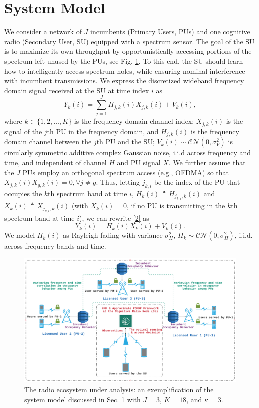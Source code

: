 \documentclass[10pt,twocolumn]{IEEEtran}
\begin{document}
\section{System Model}\label{II}
We consider a network of $J$ incumbents (Primary Users, PUs) and one cognitive radio (Secondary User, SU) equipped with a spectrum sensor. The goal of the SU is to maximize its own throughput by opportunistically accessing portions of the spectrum left unused by the PUs, see Fig. \ref{fig:0}. To this end, the SU should learn how to intelligently access spectrum holes, while ensuring nominal interference with incumbent transmissions. We express the discretized wideband frequency domain signal received at the SU at time index $i$ as
\begin{equation}\label{2}
    Y_k(i) = \sum_{j=1}^{J} H_{j,k}(i)X_{j,k}(i) + V_k(i),
\end{equation}
where  $k {\in} \{1,2,\dots,K\}$
is the frequency domain channel index; $X_{j,k}(i)$ is the signal of the $j$th PU in the frequency domain, and $H_{j,k}(i)$ is the frequency domain channel between the $j$th PU and the SU; $V_k(i) {\sim} \mathcal{CN}(0,\sigma_V^2)$ is circularly symmetric additive complex Gaussian noise, i.i.d across frequency and time, and independent of channel $H$ and PU signal $X$. We further assume that the $J$ PUs employ an orthogonal spectrum access (e.g., OFDMA) so that $X_{j,k}(i)X_{g,k}(i){=}0, \forall j{\neq}g$. Thus, letting $j_{k,i}$ be the index of the PU that occupies the $k$th spectrum band at time $i$, $H_{k}(i){\triangleq}H_{j_{k,i},k}(i)$ and $X_{k}(i){\triangleq}X_{j_{k,i},k}(i)$ (with $X_{k}(i){=}0$, if no PU is transmitting in the $k$th spectrum band at time $i$), we can rewrite \eqref{2} as 
\begin{equation}\label{3}
    Y_k(i) = H_{k}(i)X_{k}(i) + V_k(i).
\end{equation}
We model $H_{k}(i)$ as Rayleigh fading with variance $\sigma_H^2$, $H_k {\sim} \mathcal{CN}(0,\sigma_H^2)$, i.i.d. across frequency bands and time.
\begin{figure} [t]
    \centering
    \includegraphics[width=1.0\linewidth]{System_Model_1.png}
    \caption{The radio ecosystem under analysis: an exemplification of the system model discussed in Sec. \ref{II} with $J{=}3$, $K{=}18$, and $\kappa{=}3$.}
    \label{fig:0}
    \vspace{-6mm}
\end{figure}
\end{document}
